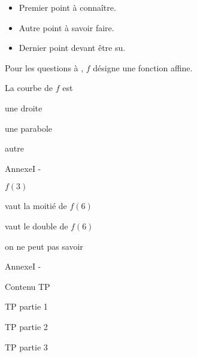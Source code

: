 \documentclass[nocrop]{sesamanuel}
\begin{document}
\connaissances
\begin{acquis}
\begin{itemize}
\item Premier point à connaître.
\item Autre point à savoir faire.
\item Dernier point devant être su.
\end{itemize}
\end{acquis}


\begin{QCM}
  \begin{EnonceCommunQCM}
    Pour les questions  à
    , $f$ désigne une
    fonction affine.
    \end{EnonceCommunQCM}

\begin{GroupeQCM}
\begin{exercice}\label{premier-qcm2}
La courbe de $f$ est
\begin{ChoixQCM}{3}
\item une droite
\item une parabole
\item autre
\end{ChoixQCM}
\end{exercice}
\begin{corrige}
  AnnexeI -
\end{corrige}
\begin{exercice}\label{deuxieme-qcm2}
$f(3)$
\begin{ChoixQCM}{3}
\item vaut la moitié de $f(6)$
\item vaut le double de $f(6)$
\item on ne peut pas savoir
\end{ChoixQCM}
\end{exercice}
\begin{corrige}
  AnnexeI -
\end{corrige}
\end{GroupeQCM}
\end{QCM}

\TravauxPratiques
\begin{TP}
  Contenu TP
  
  TP partie 1
  
  
  TP partie 2
  
  
  TP partie 3 
\end{TP}
\end{document}
